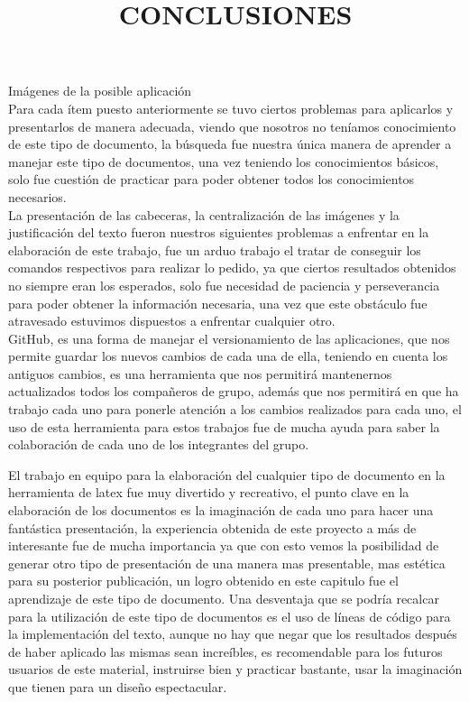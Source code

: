 \documentclass[12pt]{extbook}
\begin{document}
\textbullet{} Imágenes de la posible aplicación\\

Para cada ítem puesto anteriormente se tuvo ciertos problemas para
aplicarlos y presentarlos de manera adecuada, viendo que nosotros
no teníamos conocimiento de este tipo de documento, la búsqueda fue
nuestra única manera de aprender a manejar este tipo de documentos,
una vez teniendo los conocimientos básicos, solo fue cuestión de practicar
para poder obtener todos los conocimientos necesarios. \\

La presentación de las cabeceras, la centralización de las imágenes
y la justificación del texto fueron nuestros siguientes problemas
a enfrentar en la elaboración de este trabajo, fue un arduo trabajo
el tratar de conseguir los comandos respectivos para realizar lo pedido,
ya que ciertos resultados obtenidos no siempre eran los esperados,
solo fue necesidad de paciencia y perseverancia para poder obtener
la información necesaria, una vez que este obstáculo fue atravesado
estuvimos dispuestos a enfrentar cualquier otro.\\

GitHub, es una forma de manejar el versionamiento de las aplicaciones, que nos permite
guardar los nuevos cambios de cada una de ella, teniendo en cuenta
los antiguos cambios, es una herramienta que nos permitirá mantenernos
actualizados todos los compañeros de grupo, además que nos permitirá
en que ha trabajo cada uno para ponerle atención a los cambios realizados
para cada uno, el uso de esta herramienta para estos trabajos fue
de mucha ayuda para saber la colaboración de cada uno de los integrantes
del grupo. \\


\begin{center}
\title{CONCLUSIONES}\maketitle
\end{center}

El trabajo en equipo para la elaboración del cualquier tipo de documento
en la herramienta de latex fue muy divertido y recreativo, el punto
clave en la elaboración de los documentos es la imaginación de cada
uno para hacer una fantástica presentación, la experiencia obtenida
de este proyecto a más de interesante fue de mucha importancia ya
que con esto vemos la posibilidad de generar otro tipo de presentación
de una manera mas presentable, mas estética para su posterior publicación,
un logro obtenido en este capitulo fue el aprendizaje de este tipo
de documento. Una desventaja que se podría recalcar para la utilización
de este tipo de documentos es el uso de líneas de código para la implementación
del texto, aunque no hay que negar que los resultados después de haber
aplicado las mismas sean increíbles, es recomendable para los futuros
usuarios de este material, instruirse bien y practicar bastante, usar
la imaginación que tienen para un diseño espectacular.\\
\end{document}
